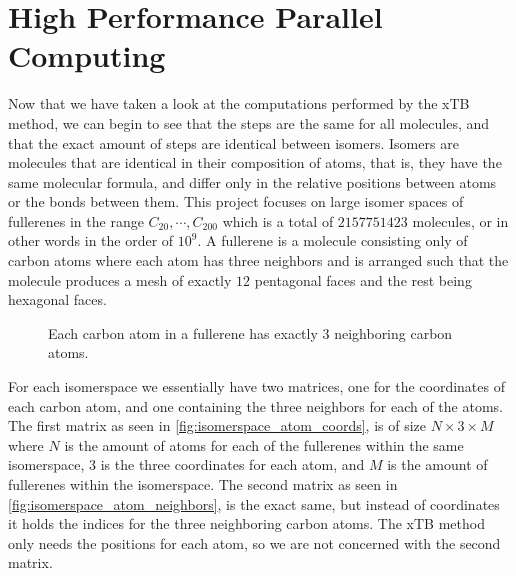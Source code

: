 \chapter{High Performance Parallel Computing}\label{sec:hppc}

Now that we have taken a look at the computations performed by the xTB method, we can begin to see that the steps are the same for all molecules, and that the exact amount of steps are identical between isomers. Isomers are molecules that are identical in their composition of atoms, that is, they have the same molecular formula, and differ only in the relative positions between atoms or the bonds between them.
This project focuses on large isomer spaces of fullerenes in the range \(C_{20}, \cdots, C_{200} \) which is a total of $2157751423$ molecules, or in other words in the order of $10^9$. A fullerene is a molecule consisting only of carbon atoms where each atom has three neighbors and is arranged such that the molecule produces a mesh of exactly $12$ pentagonal faces and the rest being hexagonal faces.

\begin{figure}[H]
\centering
{}
\caption{Each carbon atom in a fullerene has exactly 3 neighboring carbon atoms.}
\label{fig:carbon-degree}
\end{figure}

For each isomerspace we essentially have two matrices, one for the coordinates of each carbon atom, and one containing the three neighbors for each of the atoms. The first matrix as seen in \autoref{fig:isomerspace_atom_coords}, is of size $N \times 3 \times M$ where $N$ is the amount of atoms for each of the fullerenes within the same isomerspace, $3$ is the three coordinates for each atom, and $M$ is the amount of fullerenes within the isomerspace. The second matrix as seen in \autoref{fig:isomerspace_atom_neighbors}, is the exact same, but instead of coordinates it holds the indices for the three neighboring carbon atoms. The xTB method only needs the positions for each atom, so we are not concerned with the second matrix.

